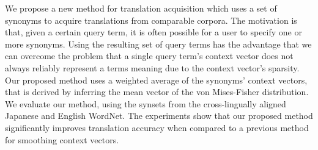 We propose a new method for translation acquisition which uses a set of synonyms to acquire translations from comparable corpora. 
 The motivation is that, given a certain query term, it is often possible for a
 user to specify one or more synonyms.
 Using the resulting set of query terms has the advantage that we can overcome
 the problem that a single query term's context vector does not always reliably
 represent a terms meaning due to the context vector's sparsity. 
 Our proposed method uses a weighted average of the synonyms' context vectors,
 that is derived by inferring the mean vector of the von Mises-Fisher
 distribution.
 We evaluate our method, using the synsets from the cross-lingually aligned
 Japanese and English WordNet.
 The experiments show that our proposed method significantly improves
 translation accuracy when compared to a previous method for smoothing context
 vectors.

